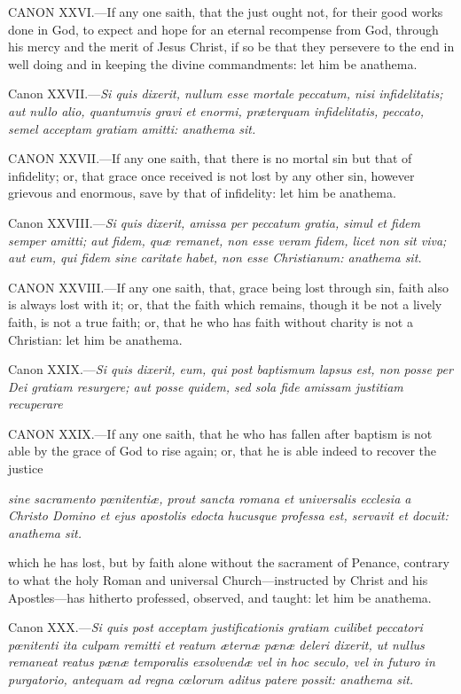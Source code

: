 CANON XXVI.—If any one saith, that the just ought not, for their good works done in God, to expect and hope for an eternal recompense from God, through his mercy and the merit of Jesus Christ, if so be that they persevere to the end in well doing and in keeping the divine commandments: let him be anathema.

Canon XXVII.—\emph{Si quis dixerit, nullum esse mortale peccatum, nisi infidelitatis; aut nullo alio, quantumvis gravi et enormi, præterquam infidelitatis, peccato, semel acceptam gratiam amitti: anathema sit.}

CANON XXVII.—If any one saith, that there is no mortal sin but that of infidelity; or, that grace once received is not lost by any other sin, however grievous and enormous, save by that of infidelity: let him be anathema.

Canon XXVIII.—\emph{Si quis dixerit, amissa per peccatum gratia, simul et fidem semper amitti; aut fidem, quæ remanet, non esse veram fidem, licet non sit viva; aut eum, qui fidem sine caritate habet, non esse Christianum: anathema sit.}

CANON XXVIII.—If any one saith, that, grace being lost through sin, faith also is always lost with it; or, that the faith which remains, though it be not a lively faith, is not a true faith; or, that he who has faith without charity is not a Christian: let him be anathema.

Canon XXIX.—\emph{Si quis dixerit, eum, qui post baptismum lapsus est, non posse per Dei gratiam resurgere; aut posse quidem, sed sola fide amissam justitiam recuperare }

CANON XXIX.—If any one saith, that he who has fallen after baptism is not able by the grace of God to rise again; or, that he is able indeed to recover the justice

\emph{sine sacramento pœnitentiæ, prout sancta romana et universalis ecclesia a Christo Domino et ejus apostolis edocta hucusque professa est, servavit et docuit: anathema sit.}

which he has lost, but by faith alone without the sacrament of Penance, contrary to what the holy Roman and universal Church—instructed by Christ and his Apostles—has hitherto professed, observed, and taught: let him be anathema.

Canon XXX.—\emph{Si quis post acceptam justificationis gratiam cuilibet peccatori pœnitenti ita culpam remitti et reatum æternæ pænæ deleri dixerit, ut nullus remaneat reatus pænæ temporalis exsolvendæ vel in hoc seculo, vel in futuro in purgatorio, antequam ad regna cœlorum aditus patere possit: anathema sit.}

